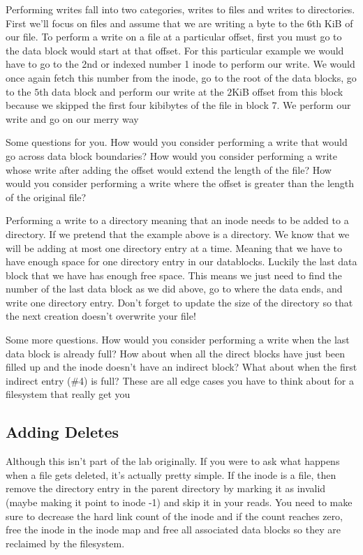 Performing writes fall into two categories, writes to files and writes to directories.
First we'll focus on files and assume that we are writing a byte to the $6$th KiB of our file.
To perform a write on a file at a particular offset, first you must go to the data block would start at that offset.
For this particular example we would have to go to the 2nd or indexed number 1 inode to perform our write.
We would once again fetch this number from the inode, go to the root of the data blocks, go to the $5$th data block and perform our write at the $2$KiB offset from this block because we skipped the first four kibibytes of the file in block 7.
We perform our write and go on our merry way

Some questions for you. How would you consider performing a write that would go across data block boundaries? How would you consider performing a write whose write after adding the offset would extend the length of the file?  How would you consider performing a write where the offset is greater than the length of the original file?

Performing a write to a directory meaning that an inode needs to be added to a directory.
If we pretend that the example above is a directory.
We know that we will be adding at most one directory entry at a time.
Meaning that we have to have enough space for one directory entry in our datablocks.
Luckily the last data block that we have has enough free space.
This means we just need to find the number of the last data block as we did above, go to where the data ends, and write one directory entry.
Don't forget to update the size of the directory so that the next creation doesn't overwrite your file!

Some more questions. How would you consider performing a write when the last data block is already full? How about when all the direct blocks have just been filled up and the inode doesn't have an indirect block? What about when the first indirect entry (\#4) is full?
These are all edge cases you have to think about for a filesystem that really get you

\subsection{Adding Deletes}

Although this isn't part of the lab originally.
If you were to ask what happens when a file gets deleted, it's actually pretty simple.
If the inode is a file, then remove the directory entry in the parent directory by marking it as invalid (maybe making it point to inode -1) and skip it in your reads.
You need to make sure to decrease the hard link count of the inode and if the count reaches zero, free the inode in the inode map and free all associated data blocks so they are reclaimed by the filesystem.

